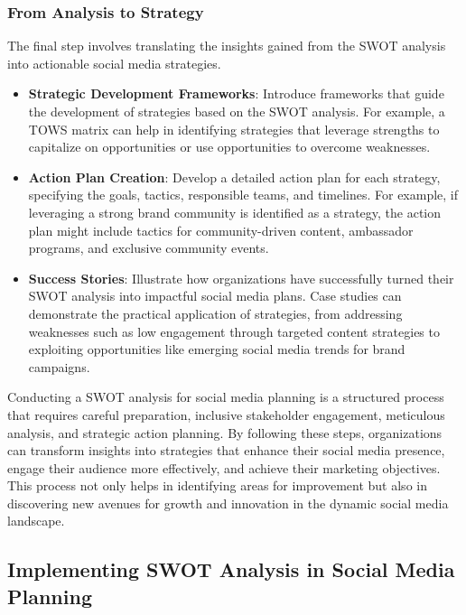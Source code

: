\documentclass[
]{book}
\providecommand{\tightlist}{%
  \setlength{\itemsep}{0pt}\setlength{\parskip}{0pt}}
\begin{document}
\hypertarget{from-analysis-to-strategy}{%
\subsubsection*{From Analysis to Strategy}\label{from-analysis-to-strategy}}

The final step involves translating the insights gained from the SWOT analysis into actionable social media strategies.

\begin{itemize}
\tightlist
\item
  \textbf{Strategic Development Frameworks}: Introduce frameworks that guide the development of strategies based on the SWOT analysis. For example, a TOWS matrix can help in identifying strategies that leverage strengths to capitalize on opportunities or use opportunities to overcome weaknesses.
\item
  \textbf{Action Plan Creation}: Develop a detailed action plan for each strategy, specifying the goals, tactics, responsible teams, and timelines. For example, if leveraging a strong brand community is identified as a strategy, the action plan might include tactics for community-driven content, ambassador programs, and exclusive community events.
\item
  \textbf{Success Stories}: Illustrate how organizations have successfully turned their SWOT analysis into impactful social media plans. Case studies can demonstrate the practical application of strategies, from addressing weaknesses such as low engagement through targeted content strategies to exploiting opportunities like emerging social media trends for brand campaigns.
\end{itemize}

Conducting a SWOT analysis for social media planning is a structured process that requires careful preparation, inclusive stakeholder engagement, meticulous analysis, and strategic action planning. By following these steps, organizations can transform insights into strategies that enhance their social media presence, engage their audience more effectively, and achieve their marketing objectives. This process not only helps in identifying areas for improvement but also in discovering new avenues for growth and innovation in the dynamic social media landscape.

\hypertarget{implementing-swot-analysis-in-social-media-planning}{%
\subsection*{Implementing SWOT Analysis in Social Media Planning}\label{implementing-swot-analysis-in-social-media-planning}}
\end{document}
